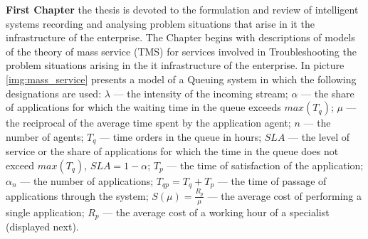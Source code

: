 \textbf{First Chapter} the thesis is devoted to the formulation and review of intelligent systems recording and analysing problem situations that arise in it the infrastructure of the enterprise.
The Chapter begins with descriptions of models of the theory of mass service (TMS) for services involved in Troubleshooting the problem situations arising in the it infrastructure of the enterprise. In picture \ref{img:mass_service} presents a model of a Queuing system in which the following designations are used: $\lambda$ --- the intensity of the incoming stream;  
$\alpha$ --- the share of applications for which the waiting time in the queue exceeds $max(T_q)$;       
$\mu$ --- the reciprocal of the average time spent by the application agent;
$n$ --- the number of agents;
$T_q$ --- time orders in the queue in hours;
$SLA$ --- the level of service or the share of applications for which the time in the queue does not exceed $max(T_q)$, $SLA=1-\alpha$;
 $T_p$ --- the time of satisfaction of the application;
 $\alpha_n$ --- the number of applications;
 $T_{qp}=T_q+T_p$ --- the time of passage of applications through the system;
 $S(\mu)= \frac{R_p}{\mu} $ --- the average cost of performing a single application;
 $R_p$ --- the average cost of a working hour of a specialist (displayed next).

